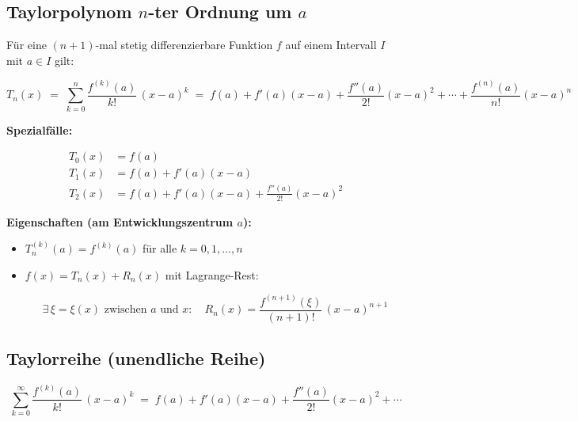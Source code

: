 \documentclass[a4paper,11pt,oneside,open=any,parskip=half, DIV=15]{scrreprt}
\begin{document}
   \subsection*{Taylorpolynom \(n\)-ter Ordnung um \(a\)}
      
      Für eine \((n+1)\)-mal stetig differenzierbare Funktion \(f\) auf einem Intervall \(I\) mit \(a\in I\) gilt:
      \begin{importantbox}
         \[
            T_n(x)
            \;=\;
            \sum_{k=0}^{n}\frac{f^{(k)}(a)}{k!}\,(x-a)^k
            \;=\;
            f(a)+f'(a)(x-a)+\frac{f''(a)}{2!}(x-a)^2+\cdots+\frac{f^{(n)}(a)}{n!}(x-a)^n
         \]
      \end{importantbox}

      \textbf{Spezialfälle:}
      \begin{importantbox}
         \[
            \begin{aligned}
               T_0(x) &= f(a)\\
               T_1(x) &= f(a) + f'(a)(x-a)\\
               T_2(x) &= f(a) + f'(a)(x-a) + \frac{f''(a)}{2!}(x-a)^2
            \end{aligned}
         \]
      \end{importantbox}

      \textbf{Eigenschaften (am Entwicklungszentrum \(a\)):}
      \begin{itemize}
         \item \(T_n^{(k)}(a)=f^{(k)}(a)\) für alle \(k=0,1,\dots,n\)
         \item \(f(x)=T_n(x)+R_n(x)\) mit Lagrange-Rest:
         \begin{importantbox}
            \[
               \exists\,\xi=\xi(x)\text{ zwischen }a\text{ und }x:\quad
               R_n(x)=\frac{f^{(n+1)}(\xi)}{(n+1)!}\,(x-a)^{n+1}
            \]
         \end{importantbox}
      \end{itemize}

   \subsection*{Taylorreihe (unendliche Reihe)}
      \begin{importantbox}
         \[
            \sum_{k=0}^{\infty}\frac{f^{(k)}(a)}{k!}\,(x-a)^k
            \;=\;
            f(a)+f'(a)(x-a)+\frac{f''(a)}{2!}(x-a)^2+\cdots
         \]
      \end{importantbox}
\end{document}
